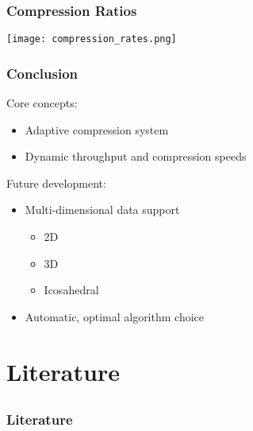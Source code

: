 \documentclass[compress]{beamer}
\begin{document}
\begin{frame}
	\frametitle{Compression Ratios}

	\begin{center}
		\texttt{[image: compression\_rates.png]}
	\end{center}

\end{frame}

\begin{frame}
	\frametitle{Conclusion}

	Core concepts:
	\begin{itemize}
		\item Adaptive compression system
		\item Dynamic throughput and compression speeds
	\end{itemize}

	\bigskip

	Future development:
	\begin{itemize}
		\item Multi-dimensional data support
		\begin{itemize}
			\item 2D
			\item 3D
			\item Icosahedral
		\end{itemize}
		\item Automatic, optimal algorithm choice
	\end{itemize}
\end{frame}

\section{Literature}
\subsection*{}

\nocite{*}

\begin{frame}
	\frametitle{Literature}

	
	
\end{frame}

\appendix
\end{document}

